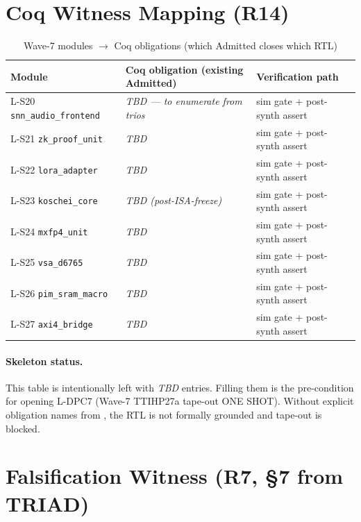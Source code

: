 \section{Coq Witness Mapping (R14)}
\label{sec:36:coq-map}

\begin{table}[H]
\centering
\caption{Wave-7 modules $\to$ Coq obligations (which Admitted closes which RTL)}
\label{tab:36:coq-map}
\small
\begin{tabular}{lll}
\toprule
Module & Coq obligation (existing Admitted) & Verification path \\
\midrule
L-S20 \texttt{snn\_audio\_frontend} & \emph{TBD --- to enumerate from trios} & sim gate + post-synth assert \\
L-S21 \texttt{zk\_proof\_unit}      & \emph{TBD} & sim gate + post-synth assert \\
L-S22 \texttt{lora\_adapter}        & \emph{TBD} & sim gate + post-synth assert \\
L-S23 \texttt{koschei\_core}        & \emph{TBD (post-ISA-freeze)} & sim gate + post-synth assert \\
L-S24 \texttt{mxfp4\_unit}          & \emph{TBD} & sim gate + post-synth assert \\
L-S25 \texttt{vsa\_d6765}           & \emph{TBD} & sim gate + post-synth assert \\
L-S26 \texttt{pim\_sram\_macro}     & \emph{TBD} & sim gate + post-synth assert \\
L-S27 \texttt{axi4\_bridge}         & \emph{TBD} & sim gate + post-synth assert \\
\bottomrule
\end{tabular}
\end{table}

\paragraph{Skeleton status.}
This table is intentionally left with \emph{TBD} entries. Filling them is the
pre-condition for opening L-DPC7 (Wave-7 TTIHP27a tape-out ONE SHOT). Without
explicit obligation names from , the
RTL is not formally grounded and tape-out is blocked.

\section{Falsification Witness (R7, \S7 from TRIAD)}
\label{sec:36:falsification}

